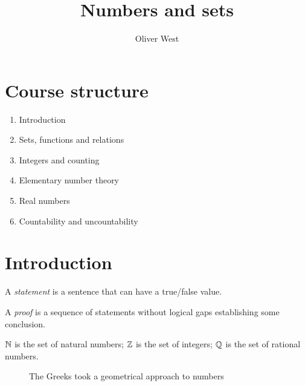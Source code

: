 \documentclass{../template/note}
\author{Oliver West}
\title{Numbers and sets}
\date{}
\begin{document}
    
    \maketitle

    \tableofcontents


    \setcounter{section}{-1}
    \section{Course structure}

    \begin{enumerate}[label=\protect\circled{\arabic*}]
        \item Introduction
        \item Sets, functions and relations
        \item Integers and counting
        \item Elementary number theory
        \item Real numbers
        \item Countability and uncountability
    \end{enumerate}

    \section{Introduction}

    \begin{definition}
        A \emph{statement} is a sentence that can have a true/false value.
    \end{definition}

    \begin{definition}
        A \emph{proof} is a sequence of statements without logical gaps establishing some conclusion.
    \end{definition}
    
    \begin{definition}
        \(\mathbb N\) is the set of natural numbers; \(\mathbb Z\) is the set of integers; \(\mathbb Q\) is the set of rational numbers.
    \end{definition}

    \begin{figure}[ht]
        \centering
        \caption{The Greeks took a geometrical approach to numbers}
        \label{fig:greek-geometry}
    \end{figure}
\end{document}
